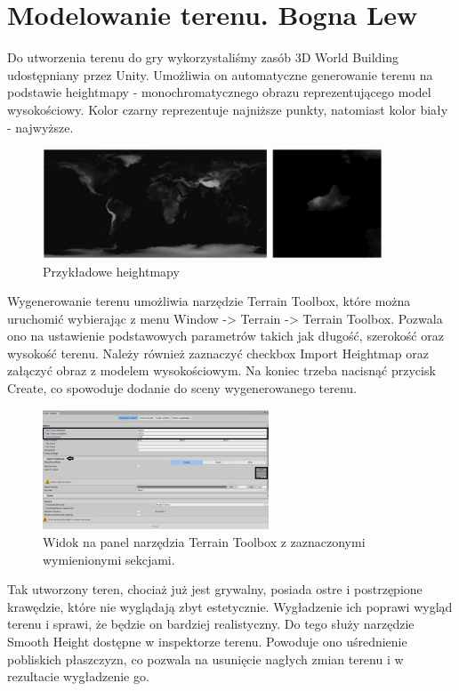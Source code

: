 \section{Modelowanie terenu. Bogna Lew}
Do utworzenia terenu do gry wykorzystaliśmy zasób 3D World Building udostępniany przez Unity. Umożliwia on automatyczne generowanie terenu na podstawie heightmapy - monochromatycznego obrazu reprezentującego model wysokościowy. Kolor czarny reprezentuje najniższe punkty, natomiast kolor biały -  najwyższe.

\begin{figure}[h!]
    \centering
    \includegraphics[width=0.9\textwidth]{images/modelowanie_terenu/przykladowe_heightmapy.jpg}
    \caption{Przykładowe heightmapy}\label{fig:przykladowe_heightmapy}
\end{figure}

Wygenerowanie terenu umożliwia narzędzie Terrain Toolbox, które można uruchomić wybierając z menu Window -> Terrain -> Terrain Toolbox. Pozwala ono na ustawienie podstawowych parametrów takich jak długość, szerokość oraz wysokość terenu. Należy również zaznaczyć checkbox Import Heightmap oraz załączyć obraz z modelem wysokościowym. Na koniec trzeba nacisnąć przycisk Create, co spowoduje dodanie do sceny wygenerowanego terenu.

\begin{figure}[h!]
    \centering
    \includegraphics[width=0.6\textwidth]{images/modelowanie_terenu/generowanie.jpg}
    \caption{Widok na panel narzędzia Terrain Toolbox z zaznaczonymi wymienionymi sekcjami.}\label{fig:generowanie_terenu}
\end{figure}

Tak utworzony teren, chociaż już jest grywalny, posiada ostre i postrzępione krawędzie, które nie wyglądają zbyt estetycznie. Wygładzenie ich poprawi wygląd terenu i sprawi, że będzie on bardziej realistyczny. Do tego służy narzędzie Smooth Height dostępne w inspektorze terenu. Powoduje ono uśrednienie pobliskich płaszczyzn, co pozwala na usunięcie nagłych zmian terenu i w rezultacie wygładzenie go.

